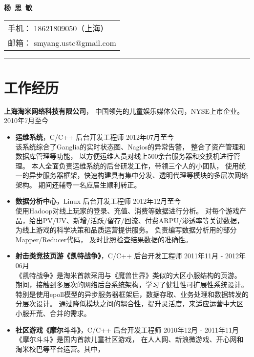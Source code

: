 \documentclass[margin]{res}
\newcommand{\taomee}{上海淘米网络科技有限公司}
\begin{document}
{\bfseries \huge 杨\ 思\ 敏}
\hfill
\begin{tabular}{l}
    手机： {18621809050（上海）}\\
    邮箱： {smyang.ustc@gmail.com}
\end{tabular}
\rule{\columnwidth}{1pt}


\section{\Large 工作经历}
{\bf \large \taomee}，
中国领先的儿童娱乐媒体公司，NYSE上市企业。
\hfill 2010年7月至今\\[1mm]
\begin{itemize}
    \item {\bf 运维系统}，C/C++ 后台开发工程师 
        \hfill 2012年07月至今\\[1mm]
        该系统综合了Ganglia的实时状态图、Nagios的异常告警，
        整合了资产管理和数据库管理等功能，
        以方便运维人员对线上500余台服务器和交换机进行管理。
        本人全面负责运维系统的后台研发工作，带领三个人的小团队，
        使用统一的异步服务器框架，快速构建具有集中分发、透明代理等模块的多层次网络架构。
        期间还辅导一名应届生顺利转正。
        \\
    \item {\bf 数据分析中心}，Linux 后台开发工程师
        \hfill 2012年12月至今\\[1mm]
        使用Hadoop对线上玩家的登录、充值、消费等数据进行分析。
        对每个游戏产品，给出PV/UV、新增/活跃/留存/回流、付费ARPU/渗透率等关键数据，
        为线上游戏的科学决策和品质运营提供服务。
        负责编写数据分析用的部分Mapper/Reducer代码，
        及时比照检查结果数据的准确性。
        \\
    \item {\bf 射击类竞技页游《凯特战争》}，C/C++ 后台开发工程师 
        \hfill 2011年11月 - 2012年06月\\[1mm]
        《凯特战争》是淘米首款采用与《魔兽世界》类似的大区小服结构的页游。
        期间，接触到多层次的网络后台系统架构，学习了健壮性可扩展性系统设计。
        特别是使用epoll模型的异步服务器框架后，数据存取、业务处理和数据转发的分层次设计。
        通过降低模块之间的耦合性，提升灵活度，来适应运营中大区小服开荒、合并的需求。
        \\
    \item {\bf 社区游戏《摩尔斗斗》}，C/C++ 后台开发工程师 
    \hfill 2010年12月 - 2011年11月\\[1mm]
        《摩尔斗斗》是国内首款儿童社区游戏，
        在人人网、新浪微游戏、开心网和淘米校巴等平台运营。其中，

\end{itemize}
\end{document}
